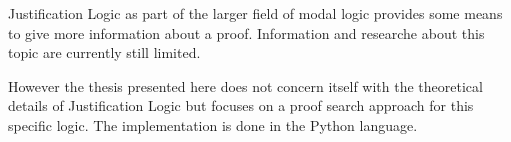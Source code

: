 
Justification Logic as part of the larger field of modal logic provides some means to give more information about a proof. Information and researche about this topic are currently still limited. 

However the thesis presented here does not concern itself with the theoretical details of Justification Logic but focuses on a proof search approach for this specific logic. The implementation is done in the Python language.